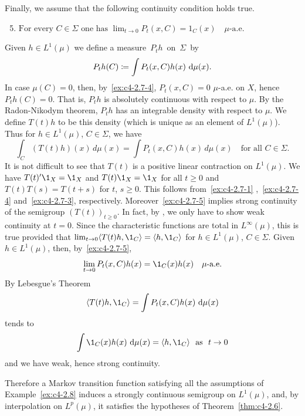 \begin{example}
Finally, we assume that the following continuity condition holds true.
\begin{enumerate}[\upshape (i)]
\setcounter{enumi}{4}
\item \label{ex:c4-2.7-5}
$\text{For every } C \in \Sigma \text{ one has } \lim_{t \to 0} P_{t}(x,C) = 1_{C}(x) \quad \mu\text{-a.e.}$
\end{enumerate}
Given $h \in L^{1}(\mu)$ we define a measure\, $P_{t}h$\, on\, $\Sigma$\, by
\[
P_{t}h(C) \coloneq \int P_{t}(x,C)h(x) \, \mathop{}\!\mathrm{d}{\mu(x)} .
\]
In case $\mu(C) = 0$, then, by~\ref{ex:c4-2.7-4}, $P_{t}(x,C) = 0$ $\mu$-a.e. on $X$, hence $P_{t}h(C) = 0$.
That is, $P_{t}h$ is absolutely continuous with respect to $\mu$.
By the Radon-Nikodym theorem, $P_{t}h$ has an integrable density with respect to $\mu$.
We define $T(t)h$ to be this density (which is unique as an element of\/ $L^{1}(\mu)$).
Thus for $h \in L^{1}(\mu)$, $C \in \Sigma$, we have
\begin{equation}\label{eq:c4-2.8}
\int_{C}(T(t)h)(x) \, d\mu(x) = \int P_{t}(x,C)h(x) \, d\mu(x) \quad \text{for all } C \in \Sigma.
\end{equation}
It is not difficult to see that $T(t)$ is a positive linear contraction on $L^{1}(\mu)$.
We have $T(t)'\1_{X} = \1_{X}$ and $T(t)\1_{X} = \1_{X}$ for all $t \geq 0$ and $T(t)T(s) = T(t+s)$ for $t$, $s \geq 0$.
This follows from~\ref{ex:c4-2.7-1} ,~\ref{ex:c4-2.7-4} and~\ref{ex:c4-2.7-3}, respectively.
Moreover~\ref{ex:c4-2.7-5} implies strong continuity of the semigroup $(T(t))_{t \geq 0}$.
In fact, by \textcite[Proposition 1.23]{davies:1980}, we only have to show weak continuity at $t = 0$.
Since the characteristic functions are total in $L^{\infty}(\mu)$, this is true provided that $\lim_{t \to 0} \langle T(t)h,\1_{C}\rangle = \langle h,\1_{C}\rangle$ for $h \in L^{1}(\mu)$, $C \in \Sigma$.
Given $h \in L^{1}(\mu)$, then, by~\ref{ex:c4-2.7-5}, 
\[
\lim_{t \to 0} P_{t}(x,C)h(x) = \1_{C}(x)h(x)\quad\mu\text{-a.e.}
\]
By Lebesgue's Theorem 
\[
\langle T(t)h,\1_{C}\rangle = \int P_{t}(x,C)h(x) \, \diff{\mu(x)}
\]
tends to 
\[
\int \1_{C}(x)h(x) \, \diff{\mu(x)} = \langle h,\1_{C}\rangle \ \text{ as } \ t \to 0
\]
and we have weak, hence strong continuity.

Therefore a Markov transition function satisfying all the assumptions of Example~\ref{ex:c4-2.8} induces a strongly continuous semigroup on $L^{1}(\mu)$, and, by interpolation on $L^{p}(\mu)$, it satisfies the hypotheses of Theorem~\ref{thm:c4-2.6}.
\end{example}
